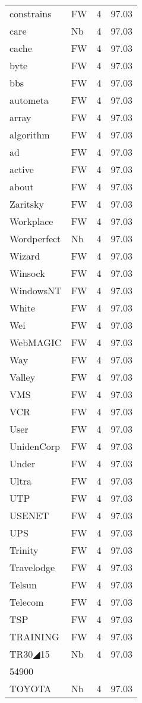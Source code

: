 \documentclass[twocolumn]{book}
\begin{document}
\begin{supertabular}{llrr}
constrains & FW & 4 &  97.03\\
care & Nb & 4 &  97.03\\
cache & FW & 4 &  97.03\\
byte & FW & 4 &  97.03\\
bbs & FW & 4 &  97.03\\
autometa & FW & 4 &  97.03\\
array & FW & 4 &  97.03\\
algorithm & FW & 4 &  97.03\\
ad & FW & 4 &  97.03\\
active & FW & 4 &  97.03\\
about & FW & 4 &  97.03\\
Zaritsky & FW & 4 &  97.03\\
Workplace & FW & 4 &  97.03\\
Wordperfect & Nb & 4 &  97.03\\
Wizard & FW & 4 &  97.03\\
Winsock & FW & 4 &  97.03\\
WindowsNT & FW & 4 &  97.03\\
White & FW & 4 &  97.03\\
Wei & FW & 4 &  97.03\\
WebMAGIC & FW & 4 &  97.03\\
Way & FW & 4 &  97.03\\
Valley & FW & 4 &  97.03\\
VMS & FW & 4 &  97.03\\
VCR & FW & 4 &  97.03\\
User & FW & 4 &  97.03\\
UnidenCorp & FW & 4 &  97.03\\
Under & FW & 4 &  97.03\\
Ultra & FW & 4 &  97.03\\
UTP & FW & 4 &  97.03\\
USENET & FW & 4 &  97.03\\
UPS & FW & 4 &  97.03\\
Trinity & FW & 4 &  97.03\\
Travelodge & FW & 4 &  97.03\\
Telsun & FW & 4 &  97.03\\
Telecom & FW & 4 &  97.03\\
TSP & FW & 4 &  97.03\\
TRAINING & FW & 4 &  97.03\\
TR30◢15 & Nb & 4 &  97.03\\
54900\\
TOYOTA & Nb & 4 &  97.03\\

\end{supertabular}
\end{document}
